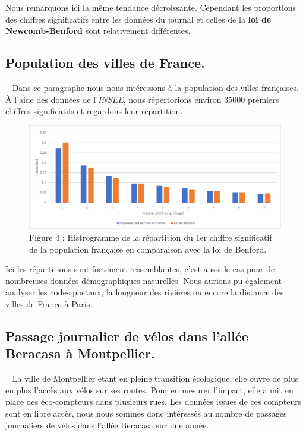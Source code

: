 \documentclass[
  12pt,
]{article}
\begin{document}
Nous remarquons ici la même tendance décroissante. Cependant les
proportions des chiffres significatifs entre les données du journal et
celles de la \textbf{loi de Newcomb-Benford} sont relativement
différentes.

\hypertarget{population-des-villes-de-france.}{%
\subsection{Population des villes de
France.}\label{population-des-villes-de-france.}}

~ Dans ce paragraphe nous nous intéressons à la population des villes
françaises. À l'aide des données de l'\emph{INSEE}, nous répertorions
environ \(35000\) premiers chiffres significatifs et regardons leur
répartition.

\begin{figure}
\centering
\includegraphics{Images/histogramme_populationfrancaise.png}
\caption{Figure 4 : Histrogramme de la répartition du 1er chiffre
significatif de la population française en comparaison avec la loi de
Benford.}
\end{figure}

Ici les répartitions sont fortement ressemblantes, c'est aussi le cas
pour de nombreuses données démographiques naturelles. Nous aurions pu
également analyser les codes postaux, la longueur des rivières ou encore
la distance des villes de France à Paris.

\newpage

\hypertarget{passage-journalier-de-vuxe9los-dans-lalluxe9e-beracasa-uxe0-montpellier.}{%
\subsection{Passage journalier de vélos dans l'allée Beracasa à
Montpellier.}\label{passage-journalier-de-vuxe9los-dans-lalluxe9e-beracasa-uxe0-montpellier.}}

~ La ville de Montpellier étant en pleine transition écologique, elle
ouvre de plus en plus l'accès aux vélos sur ses routes. Pour en mesurer
l'impact, elle a mit en place des éco-compteurs dans plusieurs rues. Les
données issues de ces compteurs sont en libre accès, nous nous sommes
donc intéressés au nombre de passages journaliers de vélos dans l'allée
Beracasa sur une année.
\end{document}
